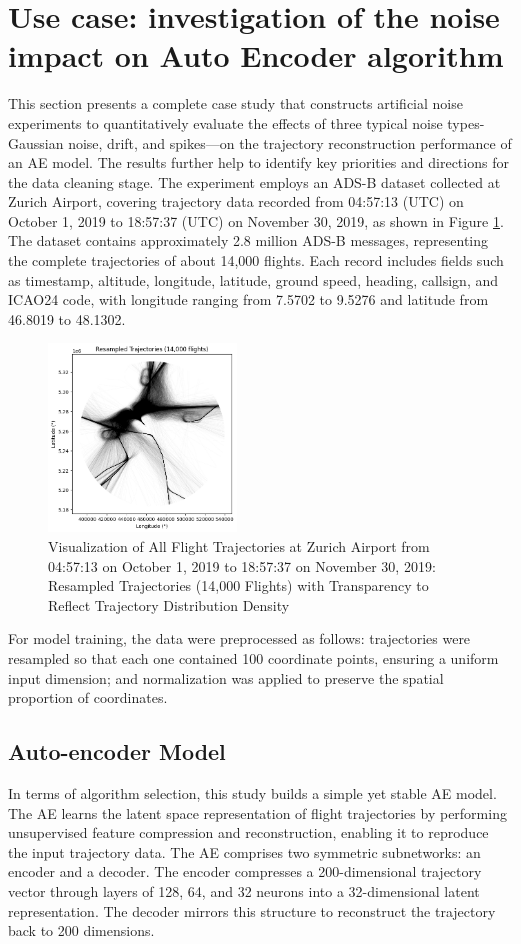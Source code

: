 \section{Use case: investigation of the noise impact on Auto Encoder algorithm}\label{usecase}
This section presents a complete case study that constructs artificial noise experiments to quantitatively evaluate the effects of three typical noise types-Gaussian noise, drift, and spikes—on the trajectory reconstruction performance of an AE model. The results further help to identify key priorities and directions for the data cleaning stage.
The experiment employs an ADS-B dataset collected at Zurich Airport, covering trajectory data recorded from 04:57:13 (UTC) on October 1, 2019 to 18:57:37 (UTC) on November 30, 2019, as shown in Figure \ref{fig:totaltracks}. The dataset contains approximately 2.8 million ADS-B messages, representing the complete trajectories of about 14,000 flights. Each record includes fields such as timestamp, altitude, longitude, latitude, ground speed, heading, callsign, and ICAO24 code, with longitude ranging from 7.5702 to 9.5276 and latitude from 46.8019 to 48.1302.
\begin{figure}[h]
	\centering
	\includegraphics[height=5cm]{totaltracks}
	\caption{Visualization of All Flight Trajectories at Zurich Airport from 04:57:13 on October 1, 2019 to 18:57:37 on November 30, 2019: Resampled Trajectories (14,000 Flights) with Transparency to Reflect Trajectory Distribution Density}
	\label{fig:totaltracks}
\end{figure}

For model training, the data were preprocessed as follows: trajectories were resampled so that each one contained 100 coordinate points, ensuring a uniform input dimension; and normalization was applied to preserve the spatial proportion of coordinates.

\subsection{Auto-encoder Model}
In terms of algorithm selection, this study builds a simple yet stable AE model. The AE learns the latent space representation of flight trajectories by performing unsupervised feature compression and reconstruction, enabling it to reproduce the input trajectory data.
The AE comprises two symmetric subnetworks: an encoder and a decoder. The encoder compresses a 200-dimensional trajectory vector through layers of 128, 64, and 32 neurons into a 32-dimensional latent representation. The decoder mirrors this structure to reconstruct the trajectory back to 200 dimensions.


